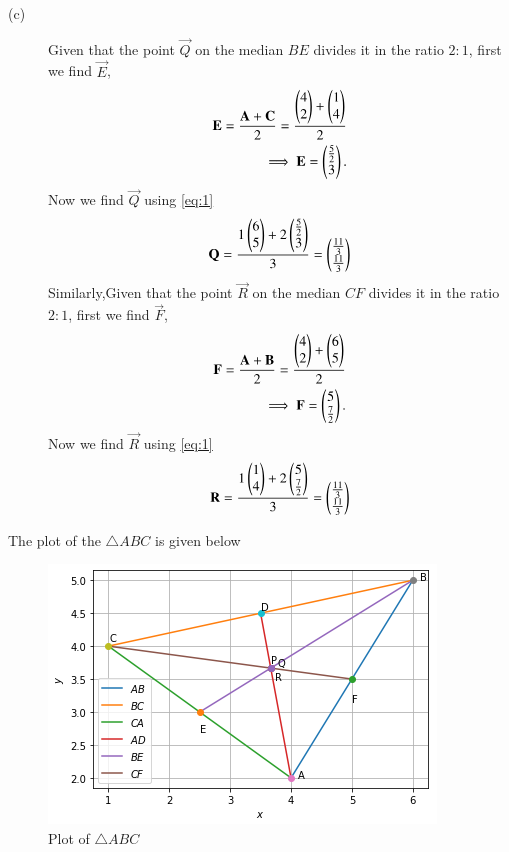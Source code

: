 \documentclass[journal,12pt,twocolumn]{IEEEtran}
\begin{document}
\begin{description}
\item [(c)] Given that the point $\vec{Q}$ on the median $BE$ divides it in the ratio $2:1$, first we find $\vec{E}$,
\begin{align}
    \mathbf{E} =\frac{\mathbf{A}+\mathbf{C}}{2} = \frac{\begin{pmatrix}4 \\ 2\end{pmatrix}+\begin{pmatrix}1 \\ 4\end{pmatrix}}{2}\\
    \implies \mathbf{E} = \begin{pmatrix}\frac{5}{2} \\ 3\end{pmatrix}.
\end{align}
Now we find $\vec{Q}$ using \eqref{eq:1}
\begin{align}
   \mathbf{Q}=\frac{1\begin{pmatrix}6\\5\end{pmatrix}+2\begin{pmatrix}\frac{5}{2}\\3\end{pmatrix}}{3}=\begin{pmatrix}\frac{11}{3} \\ \frac{11}{3}\end{pmatrix} 
\end{align}
Similarly,Given that the point $\vec{R}$ on the median $CF$ divides it in the ratio $2:1$, first we find $\vec{F}$,
\begin{align}
    \mathbf{F} =\frac{\mathbf{A}+\mathbf{B}}{2} = \frac{\begin{pmatrix}4 \\ 2\end{pmatrix}+\begin{pmatrix}6 \\ 5\end{pmatrix}}{2}\\
    \implies \mathbf{F} = \begin{pmatrix}5 \\ \frac{7}{2}\end{pmatrix}.
\end{align}
Now we find $\vec{R}$ using \eqref{eq:1}
\begin{align}
   \mathbf{R}=\frac{1\begin{pmatrix}1\\4\end{pmatrix}+2\begin{pmatrix}5 \\ \frac{7}{2}\end{pmatrix}}{3}=\begin{pmatrix}\frac{11}{3} \\ \frac{11}{3}\end{pmatrix} 
\end{align}
\end{description}
The plot of the $\triangle ABC$ is given below
\begin{figure}[ht]
    \centering
    \includegraphics[width=\columnwidth]{TriangleABC.PNG}
    \caption{Plot of $\triangle ABC$}
    \label{fig:$\triangle ABC$}
\end{figure}
\end{document}
